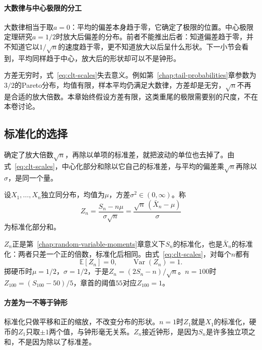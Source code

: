 \paragraph{大数律与中心极限的分工}
大数律相当于取$a=0$：平均的偏差本身趋于零，它确定了极限的位置。中心极限定理研究$a=1/2$时放大后偏差的分布。前者不能推出后者：知道偏差趋于零，并不知道它以$1/\sqrt{n}$的速度趋于零，更不知道放大以后呈什么形状。下一小节会看到，平均同样趋于中心，放大后的形状却可以不是钟形。

方差无穷时，式~\eqref{eq:clt-scales}失去意义。例如第~\ref{chap:tail-probabilities}章参数为$3/2$的Pareto分布，均值有限，样本平均仍满足大数律，方差却是无穷，$\sqrt{n}$不再是合适的放大倍数。本章始终假设方差有限，这类重尾的极限需要别的尺度，不在本卷讨论。

\subsection{标准化的选择}
\label{sec:clt-standardization}

确定了放大倍数$\sqrt{n}$，再除以单项的标准差，就把波动的单位也去掉了。由式~\eqref{eq:clt-scales}，中心化部分和除以它自己的标准差，与平均的偏差乘$\sqrt{n}$再除以$\sigma$，是同一个量。

\begin{definition}[标准化部分和]
\label{def:clt-standardized-sum}
设$X_1,\dots,X_n$独立同分布，均值为$\mu$，方差$\sigma^2\in(0,\infty)$。称
\begin{equation}
 Z_n=\frac{S_n-n\mu}{\sigma\sqrt{n}}=\frac{\sqrt{n}\,(\bar{X}_n-\mu)}{\sigma}
 \label{eq:clt-zn}
\end{equation}
为标准化部分和。
\end{definition}

$Z_n$正是第~\ref{chap:random-variable-moments}章意义下$S_n$的标准化，也是$\bar{X}_n$的标准化：两者只差一个正的倍数，标准化后相同。由式~\eqref{eq:clt-scales}，对每个$n$都有
\[
 \mathbb{E}[Z_n]=0,\qquad \operatorname{Var}(Z_n)=1 .
\]
掷硬币时$\mu=1/2$，$\sigma=1/2$，于是$Z_n=(2S_n-n)/\sqrt{n}$。$n=100$时$Z_{100}=(S_{100}-50)/5$，章首的阈值$55$对应$Z_{100}=1$。

\paragraph{方差为一不等于钟形}
标准化只做平移和正的缩放，不改变分布的形状。$n=1$时$Z_1$就是$X_1$的标准化，硬币的$Z_1$只取$\pm1$两个值，与钟形毫无关系。$Z_n$接近钟形，是因为$S_n$是许多独立项之和，不是因为除以了标准差。

